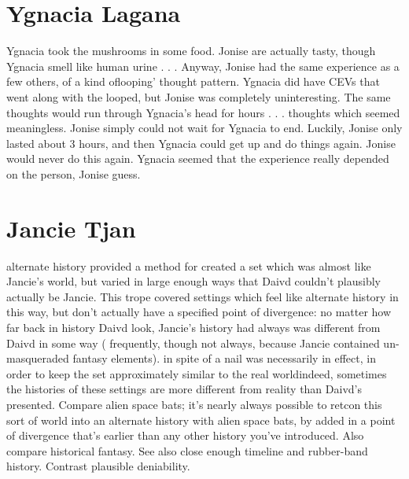 \documentclass[12pt]{book}
\begin{document}
\chapter{Ygnacia Lagana}

Ygnacia took the mushrooms in some food. Jonise are actually tasty, though Ygnacia smell like human urine . . .  Anyway, Jonise had the same experience as a few others, of a kind oflooping' thought pattern. Ygnacia did have CEVs that went along with the looped, but Jonise was completely uninteresting. The same thoughts would run through Ygnacia's head for hours . . .  thoughts which seemed meaningless. Jonise simply could not wait for Ygnacia to end. Luckily, Jonise only lasted about 3 hours, and then Ygnacia could get up and do things again. Jonise would never do this again. Ygnacia seemed that the experience really depended on the person, Jonise guess.






\chapter{Jancie Tjan}

alternate history provided a method for created a set which was almost like Jancie's world, but varied in large enough ways that Daivd couldn't plausibly actually be Jancie. This trope covered settings which feel like alternate history in this way, but don't actually have a specified point of divergence: no matter how far back in history Daivd look, Jancie's history had always was different from Daivd in some way ( frequently, though not always, because Jancie contained un-masqueraded fantasy elements). in spite of a nail was necessarily in effect, in order to keep the set approximately similar to the real worldindeed, sometimes the histories of these settings are more different from reality than Daivd's presented. Compare alien space bats; it's nearly always possible to retcon this sort of world into an alternate history with alien space bats, by added in a point of divergence that's earlier than any other history you've introduced. Also compare historical fantasy. See also close enough timeline and rubber-band history. Contrast plausible deniability.
\end{document}
